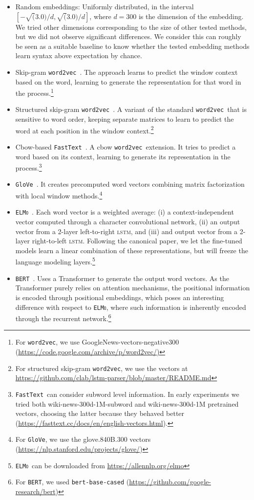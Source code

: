 \documentclass[letterpaper]{article} %
\newcommand{\wordvec}{\texttt{word2vec}}
\newcommand{\fastext}{\texttt{FastText}}
\newcommand{\glove}{\texttt{\textsc{G}lo\textsc{V}e}}
\newcommand{\elmo}{\texttt{\textsc{ELMo}}}
\newcommand{\bert}{\texttt{\textsc{BERT}}}
\begin{document}
\begin{itemize}
    \item Random embeddings: Uniformly distributed, in the interval $[-\sqrt(3.0) / d, \sqrt(3.0) / d]$, where $d=300$ is the dimension of the embedding. We tried other dimensions corresponding to the size of other tested methods, but we did not observe significant differences. We consider this can roughly be seen as a suitable baseline
    to know whether the tested embedding methods learn syntax above expectation by chance.
    \item {Skip-gram \wordvec}~\cite{mikolov2013distributed}. The approach learns to predict the window context based on the word, learning to generate the representation for that word in the process.\footnote{For \wordvec, we use GoogleNews-vectors-negative300 (\url{https://code.google.com/archive/p/word2vec/)}}
    \item Structured skip-gram \wordvec~\cite{ling2015two}. A variant of the standard \wordvec\ that is sensitive to word order, keeping separate matrices to learn to predict the word at each position in the window context.\footnote{For structured skip-gram \wordvec, we use the vectors at \url{https://github.com/clab/lstm-parser/blob/master/README.md}}
    \item Cbow-based {\fastext}~\cite{bojanowski2017enriching}. A cbow \wordvec\ extension. It tries to predict a word based on its context, learning to generate its representation in the process.\footnote{\fastext\ can consider subword level information. In early experiments we tried both wiki-news-300d-1M-subword and wiki-news-300d-1M pretrained vectors, choosing the latter because they behaved better (\url{https://fasttext.cc/docs/en/english-vectors.html}).}

    \item {\glove}~\cite{pennington2014glove}. It creates precomputed word vectors combining matrix factorization with local window methods.\footnote{For \glove, we use the glove.840B.300 vectors (\url{https://nlp.stanford.edu/projects/glove/})}

    \item {\elmo}~\cite{peters2018deep}. Each word vector is a weighted average: (i) a context-independent vector computed through a character convolutional network, (ii) an output vector from a 2-layer left-to-right \textsc{lstm}, and (iii) and output vector from a 2-layer right-to-left \textsc{lstm}. Following the canonical paper, we let the fine-tuned models learn a linear combination of these representations, but will freeze the language modeling layers.\footnote{\elmo\ can be downloaded from \url{https://allennlp.org/elmo}}

\item {\bert}~\cite{devlin2018bert}. Uses a Transformer to generate the output word vectors.
As the Transformer purely relies on attention mechanisms, the positional information is encoded through positional embeddings, which poses an interesting difference with respect to \elmo, where such information is inherently encoded through the recurrent network.\footnote{For \bert, we used \texttt{bert-base-cased} (\url{https://github.com/google-research/bert})}
\end{itemize}
\end{document}
